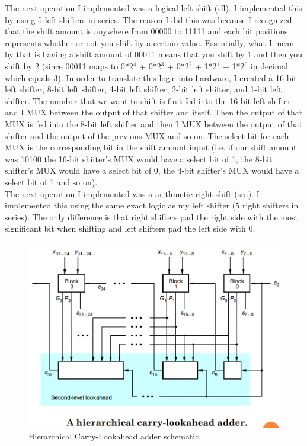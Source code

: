 \documentclass[letterpaper]{article} %
\begin{document}
    The next operation I implemented was a logical left shift (sll). I implemented this by using 5 left shifters in series. The reason I did this was because I recognized that the shift amount is anywhere from 00000 to 11111 and each bit positions represents whether or not you shift by a certain value. Essentially, what I mean by that is having a shift amount of 00011 means that you shift by 1 and then you shift by 2 (since 00011 maps to 0*2$^4$ + 0*2$^3$ + 0*2$^2$ + 1*2$^1$ + 1*2$^0$ in decimal which equals 3). In order to translate this logic into hardware, I created a 16-bit left shifter, 8-bit left shifter, 4-bit left shifter, 2-bit left shifter, and 1-bit left shifter. The number that we want to shift is first fed into the 16-bit left shifter and I MUX between the output of that shifter and itself. Then the output of that MUX is fed into the 8-bit left shifter and then I MUX between the output of that shifter and the output of the previous MUX and so on. The select bit for each MUX is the corresponding bit in the shift amount input (i.e. if our shift amount was 10100 the 16-bit shifter's MUX would have a select bit of 1, the 8-bit shifter's MUX would have a select bit of 0, the 4-bit shifter's MUX would have a select bit of 1 and so on). \\
    
    The next operation I implemented was a arithmetic right shift (sra). I implemented this using the same exact logic as my left shifter (5 right shifters in series). The only difference is that right shifters pad the right side with the most significant bit when shifting and left shifters pad the left side with 0.
    
       \FloatBarrier

  \begin{figure}[!htb]
        \includegraphics[scale=.5]{HierarchicalCarryLookaheadAdder.PNG}
        \caption{Hierarchical Carry-Lookahead adder schematic}
        \label{fig:2}
    \end{figure}
    
\end{document}
